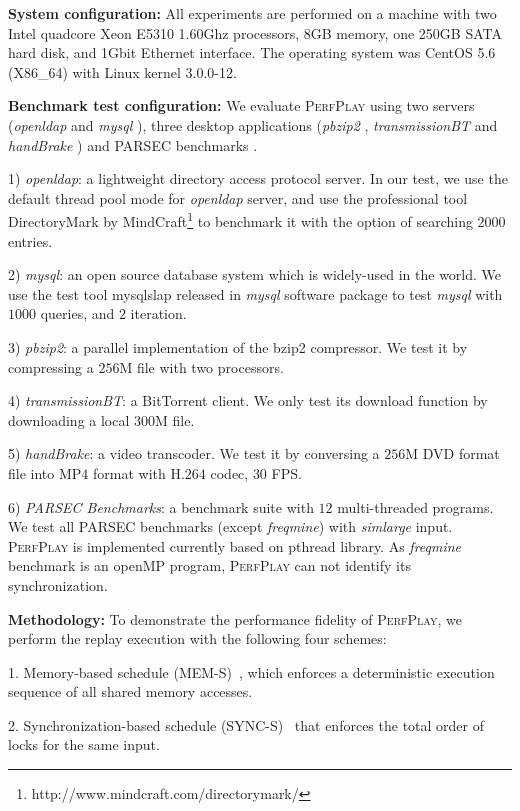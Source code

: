 \textbf{System configuration:} All experiments are performed on a machine with two Intel quadcore Xeon E5310 1.60Ghz processors, 8GB memory, one 250GB SATA hard disk, and 1Gbit Ethernet interface. The operating system was CentOS 5.6 (X86\_64) with Linux kernel 3.0.0-12.

\textbf{Benchmark test configuration:}
We evaluate \textsc{PerfPlay} using two servers (\emph{openldap} \cite{OpenLDAP} and \emph{mysql} \cite{mysql}), three desktop applications (\emph{pbzip2} \cite{pbzip2}, \emph{transmissionBT} \cite{transmissionbt} and \emph{handBrake} \cite{handbrake}) and PARSEC benchmarks \cite{parsec}. 

1) \emph{openldap}: a lightweight directory access protocol server. In our test, we use the default thread pool mode for \emph{openldap} server, and use the professional tool DirectoryMark by MindCraft\footnote{http://www.mindcraft.com/directorymark/} to benchmark it with the option of searching $2000$ entries.

2) \emph{mysql}: an open source database system which is widely-used in the world. We use the test tool mysqlslap released in \emph{mysql} software package to test \emph{mysql} with $1000$ queries, and $2$ iteration.

3) \emph{pbzip2}: a parallel implementation of the bzip2 compressor. We test it by compressing a $256$M file with two processors.

4) \emph{transmissionBT}: a BitTorrent client. We only test its download function by downloading a local 300M file.

5) \emph{handBrake}: a video transcoder. We test it by conversing a $256$M  DVD format file into MP$4$ format with H.$264$ codec, $30$ FPS.

6) \emph{PARSEC Benchmarks}: a benchmark suite with $12$ multi-threaded programs. We test all PARSEC benchmarks (except \emph{freqmine}) with \emph{simlarge} input. \textsc{PerfPlay} is implemented currently based on \textsf{pthread} library. As \emph{freqmine} benchmark is an \textsf{openMP} program, \textsc{PerfPlay} can not identify its synchronization. 

\textbf{Methodology:} To demonstrate the performance fidelity of \textsc{PerfPlay}, we perform the replay execution with the following four schemes:


1. Memory-based schedule (MEM-S)~\cite{pinplay}, which enforces a deterministic execution sequence of all shared memory accesses.

2. Synchronization-based schedule (SYNC-S)~\cite{Kendo} that enforces the total order of locks for the same input.

